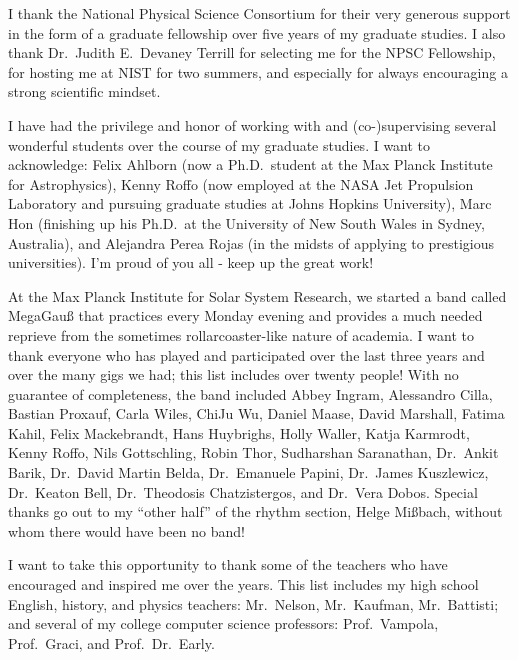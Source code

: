 I thank the National Physical Science Consortium for their very generous support in the form of a graduate fellowship over five years of my graduate studies. 
I also thank Dr.\ Judith E.\ Devaney Terrill for selecting me for the NPSC Fellowship, for hosting me at NIST for two summers, and especially for always encouraging a strong scientific mindset. 

I have had the privilege and honor of working with and (co-)supervising several wonderful students over the course of my graduate studies. 
I want to acknowledge: Felix Ahlborn (now a Ph.D.\ student at the Max Planck Institute for Astrophysics), Kenny Roffo (now employed at the NASA Jet Propulsion Laboratory and pursuing graduate studies at Johns Hopkins University), Marc Hon (finishing up his Ph.D.\ at the University of New South Wales in Sydney, Australia), and Alejandra Perea Rojas (in the midsts of applying to prestigious universities). 
I'm proud of you all - keep up the great work! 

At the Max Planck Institute for Solar System Research, we started a band called MegaGau{\ss} that practices every Monday evening and provides a much needed reprieve from the sometimes rollarcoaster-like nature of academia. 
I want to thank everyone who has played and participated over the last three years and over the many gigs we had; this list includes over twenty people! 
With no guarantee of completeness, the band included 
Abbey Ingram, %
Alessandro Cilla, %
Bastian Proxauf, %
Carla Wiles, %
ChiJu Wu, %
Daniel Maase,
David Marshall, %
Fatima Kahil, %
Felix Mackebrandt, %
Hans Huybrighs, %
Holly Waller, %
Katja Karmrodt, %
Kenny Roffo, %
Nils Gottschling, %
Robin Thor, %
Sudharshan Saranathan, %
Dr.\ Ankit Barik, %
Dr.\ David Martin Belda, %
Dr.\ Emanuele Papini, %
Dr.\ James Kuszlewicz, %
Dr.\ Keaton Bell, %
Dr.\ Theodosis Chatzistergos, and
Dr.\ Vera Dobos. %
Special thanks go out to my ``other half'' of the rhythm section, Helge Mi{\ss}bach, without whom there would have been no band! 

I want to take this opportunity to thank some of the teachers who have encouraged and inspired me over the years. 
This list includes my high school English, history, and physics teachers: Mr.\ Nelson, Mr.\ Kaufman, Mr.\ Battisti; and several of my college computer science professors: Prof.\ Vampola, Prof.\ Graci, and Prof.\ Dr.\ Early. 

